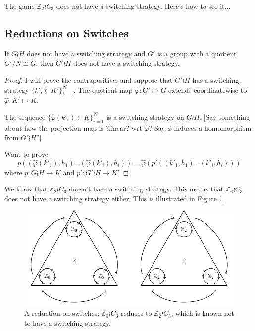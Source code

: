 \begin{example}
  The game $\mathbb Z_2 \wr C_3$ does not have a switching strategy. Here's how to see it...
  \label{ex:NoSolutionZ2C3}
\end{example}

\subsection{Reductions on Switches}
\begin{theorem}
  If $G \wr H$ does not have a switching strategy and $G'$ is a group with
  a quotient $G'/N \cong G$, then ${G'} \wr H$ does not have a switching
  strategy.
  \label{thm:SwitchReduction}
\end{theorem}
\begin{proof}
  I will prove the contrapositive, and suppose that $G' \wr H$ has a
  switching strategy $\{k'_i \in K'\}_{i=1}^N$. The quotient map
  $\varphi\colon G' \mapsto G$
  extends coordinatewise to
  $\hat\varphi \colon K' \mapsto K$.

  The sequence $\{\hat\varphi(k'_i) \in K\}_{i=1}^N$ is a switching strategy on
  $G \wr H$.
  [Say something about how the projection map is ?linear? wrt $\hat\varphi$?
  Say $\phi$ induces a homomorphism from $G' \wr H$?]

  Want to prove \[
    p((\hat\varphi(k'_1),h_1)\dots(\hat\varphi(k'_i),h_i)) =
    \hat\varphi(p'((k'_1,h_1)\dots(k'_i,h_i)))
  \] where $p \colon G \wr H \rightarrow K$ and $p' \colon G' \wr H \rightarrow K'$
\end{proof}
\begin{example}
  We know that $\mathbb Z_2 \wr C_3$ doesn't have a switching strategy.
  This means that $\mathbb Z_6 \wr C_3$ does not have a switching strategy either.
  This is illustrated in Figure \ref{fig:Z2C3}
  \begin{figure}
    \center
    \includegraphics{assets/tikz_Z2C3.pdf}
    \caption{
      A reduction on switches:
      $\mathbb Z_6 \wr C_3$ reduces to $\mathbb Z_2 \wr C_3$,
      which is known not to have a switching strategy.
    }
    \label{fig:Z2C3}
  \end{figure}
\end{example}
